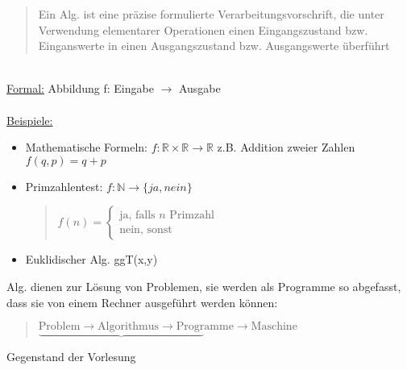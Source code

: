 \begin{quote}
Ein Alg. ist eine präzise formulierte Verarbeitungsvorschrift, die unter Verwendung elementarer Operationen einen Eingangszustand bzw. Einganswerte in einen Ausgangszustand bzw. Ausgangswerte überführt
\end{quote}
~\\
\underline{Formal:} Abbildung f: Eingabe $\rightarrow$ Ausgabe \\
~\\
\underline{Beispiele:}
\begin{itemize}
 \item Mathematische Formeln: $f: \mathbb{R} \times \mathbb{R} \rightarrow \mathbb{R}$ z.B. Addition zweier Zahlen $f(q,p) = q+p$
 \item Primzahlentest: $f: \mathbb{N} \rightarrow \{ ja, nein\}$ \\
  \begin{quote}
   $ f(n)=\left\{\begin{array}{cl}  \mbox{ja, falls }n \mbox{ Primzahl} \\ \mbox{nein, sonst} \end{array}\right. $
  \end{quote}
 \item  Euklidischer Alg.  ggT(x,y)
\end{itemize}
Alg. dienen zur Lösung von Problemen, sie werden als Programme so abgefasst, dass sie von einem Rechner ausgeführt werden können: \\
\begin{quote}
  $ \underbrace{\mbox{Problem} \rightarrow \mbox{Algorithmus} \rightarrow \mbox{Progr}}\mbox{amme} \rightarrow \mbox{Maschine} $
\end{quote}
Gegenstand der Vorlesung

